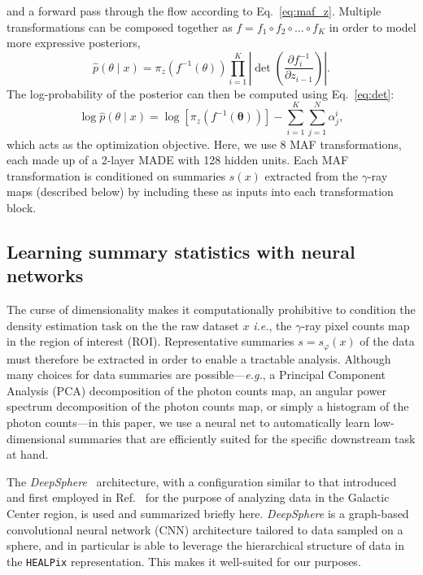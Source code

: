\documentclass[prd,aps,10pt,nofootinbib,twocolumn,superscriptaddress,preprintnumbers,balancelastpage,longbibliography]{revtex4-1}
\begin{document}
and a forward pass through the flow according to Eq.~\eqref{eq:maf_z}.
Multiple transformations can be composed together as $f=f_{1} \circ f_{2} \circ \ldots \circ f_{K}$ in order to model more expressive posteriors,
\begin{equation}
    \hat{p}({\theta} \mid {x})=\pi_{z}\left(f^{-1}({\theta})\right) \prod_{i=1}^{K}\left|\operatorname{det}\left(\frac{\partial f_{i}^{-1}}{\partial {z}_{i-1}}\right)\right|.
\end{equation}
The log-probability of the posterior can then be computed using Eq.~\eqref{eq:det}:
\begin{equation}
    \log \hat{p}({\theta} \mid {x}) = \log \left[\pi_{z}\left(f^{-1}(\boldsymbol{\theta})\right)\right]-\sum_{i=1}^{K} \sum_{j=1}^{N} \alpha_{j}^{i},
\end{equation}
which acts as the optimization objective. Here, we use 8 MAF transformations, each made up of a 2-layer MADE with 128 hidden units. Each MAF transformation is conditioned on summaries $s(x)$  extracted from the $\gamma$-ray maps (described below) by including these as inputs into each transformation block.

\subsection{Learning summary statistics with neural networks}

The curse of dimensionality makes it computationally prohibitive to condition the density estimation task on the the raw dataset $x$ \emph{i.e.}, the $\gamma$-ray pixel counts map in the region of interest (ROI). Representative summaries $s = s_\varphi(x)$ of the data must therefore be extracted in order to enable a tractable analysis. Although many choices for data summaries are possible---\emph{e.g.}, a Principal Component Analysis (PCA) decomposition of the photon counts map, an angular power spectrum decomposition of the photon counts map, or simply a histogram of the photon counts---in this paper, we use a neural net to automatically learn low-dimensional summaries that are efficiently suited for the specific downstream task at hand.

The \emph{DeepSphere}~\cite{defferrard2020deepsphere,Perraudin:2018rbt} architecture, with a configuration similar to that introduced and first employed in Ref.~\cite{List:2020mzd} for the purpose of analyzing \Fermi data in the Galactic Center region, is used and summarized briefly here. \emph{DeepSphere} is a graph-based convolutional neural network (CNN) architecture tailored to data sampled on a sphere, and in particular is able to leverage the hierarchical structure of data in the \texttt{HEALPix} representation. This makes it well-suited for our purposes.
\end{document}
